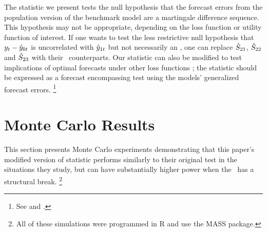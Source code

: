 \documentclass[12pt,fleqn]{article}
\begin{document}
\begin{lem}\label{lem:2}\end{lem}

\begin{rem}
  The statistic we present tests the null hypothesis that the forecast
  errors from the population version of the benchmark model are a
  martingale difference sequence.  This hypothesis may not be
  appropriate, depending on the loss function or utility function of
  interest.  If one wants to test the less restrictive null hypothesis that
  $y_{t} - \hat{y}_{0t}$ is uncorrelated with $\hat{y}_{1t}$ but not
  necessarily an \mds, one can replace $\hat{S}_{21}$, $\hat{S}_{22}$
  and $\hat{S}_{23}$ with their \hac\ counterparts.
  Our statistic can also be modified to test implications of
  optimal forecasts under other loss functions
  \citep[see][]{PaT:07,PaT:07b}; the statistic should be expressed as
  a forecast encompassing test using the models' generalized forecast
  errors.%
\footnote{See \citet{HLN:98} and \citet[Section~4]{ClW:07}.} %
\end{rem}

\section{Monte Carlo Results}\label{sec:2}
This section presents Monte Carlo experiments demonstrating that
this paper's modified version of  statistic performs
similarly to their original test in the situations they study, but can
have substantially higher power when the \dgp\ has a structural
break.%
\footnote{All of these simulations were programmed in R
  \citep[version 2.14.0]{R} and use the MASS
  \citep[7.3-22]{VeR:02} package.} %
\end{document}
